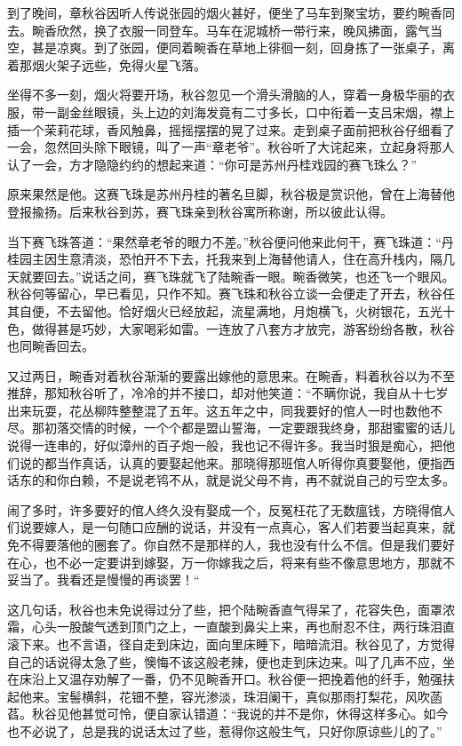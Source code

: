 \documentclass[12pt,UTF8]{ctexbook}
\begin{document}
{{{到了晚间，章秋谷因听人传说张园的烟火甚好，便坐了马车到聚宝坊，要约畹香同去。畹香欣然，换了衣服一同登车。马车在泥城桥一带行来，晚风拂面，露气当空，甚是凉爽。到了张园，便同着畹香在草地上徘徊一刻，回身拣了一张桌子，离着那烟火架子远些，免得火星飞落。

坐得不多一刻，烟火将要开场，秋谷忽见一个滑头滑脑的人，穿着一身极华丽的衣服，带一副金丝眼镜，头上边的刘海发竟有二寸多长，口中衔着一支吕宋烟，襟上插一个茉莉花球，香风触鼻，摇摇摆摆的晃了过来。走到桌子面前把秋谷仔细看了一会，忽然回头除下眼镜，叫了一声“章老爷”。秋谷听了大诧起来，立起身将那人认了一会，方才隐隐约约的想起来道：“你可是苏州丹桂戏园的赛飞珠么？”

原来果然是他。这赛飞珠是苏州丹桂的著名旦脚，秋谷极是赏识他，曾在上海替他登报揄扬。后来秋谷到苏，赛飞珠亲到秋谷寓所称谢，所以彼此认得。

当下赛飞珠答道：“果然章老爷的眼力不差。”秋谷便问他来此何干，赛飞珠道：“丹桂园主因生意清淡，恐怕开不下去，托我来到上海替他请人，住在高升栈内，隔几天就要回去。”说话之间，赛飞珠就飞了陆畹香一眼。畹香微笑，也还飞一个眼风。秋谷何等留心，早已看见，只作不知。赛飞珠和秋谷立谈一会便走了开去，秋谷任其自便，不去留他。恰好烟火已经放起，流星满地，月炮横飞，火树银花，五光十色，做得甚是巧妙，大家喝彩如雷。一连放了八套方才放完，游客纷纷各散，秋谷也同畹香回去。

又过两日，畹香对着秋谷渐渐的要露出嫁他的意思来。在畹香，料着秋谷以为不至推辞，那知秋谷听了，冷冷的并不接口，却对他笑道：“不瞒你说，我自从十七岁出来玩耍，花丛柳阵整整混了五年。这五年之中，同我要好的倌人一时也数他不尽。那初落交情的时候，一个个都是盟山誓海，一定要跟我终身，那甜蜜蜜的话儿说得一连串的，好似漳州的百子炮一般，我也记不得许多。我当时狠是痴心，把他们说的都当作真话，认真的要娶起他来。那晓得那班倌人听得你真要娶他，便指西话东的和你白赖，不是说老鸨不从，就是说父母不肯，再不就说自己的亏空太多。

闹了多时，许多要好的倌人终久没有娶成一个，反冤枉花了无数瘟钱，方晓得倌人们说要嫁人，是一句随口应酬的说话，并没有一点真心，客人们若要当起真来，就免不得要落他的圈套了。你自然不是那样的人，我也没有什么不信。但是我们要好在心，也不必一定要讲到嫁娶，万一你嫁我之后，将来有些不像意思地方，那就不妥当了。我看还是慢慢的再谈罢！“

这几句话，秋谷也未免说得过分了些，把个陆畹香直气得呆了，花容失色，面罩浓霜，心头一股酸气透到顶门之上，一直酸到鼻尖上来，再也耐忍不住，两行珠泪直滚下来。也不言语，径自走到床边，面向里床睡下，暗暗流泪。秋谷见了，方觉得自己的话说得太急了些，懊悔不该这般老辣，便也走到床边来。叫了几声不应，坐在床沿上又温存劝解了一番，仍不见畹香开口。秋谷便一把挽着他的纤手，勉强扶起他来。宝髻横斜，花钿不整，容光渗淡，珠泪阑干，真似那雨打梨花，风吹菡萏。秋谷见他甚觉可怜，便自家认错道：“我说的并不是你，休得这样多心。如今也不必说了，总是我的说话太过了些，惹得你这般生气，只好你原谅些儿的了。”

}}}
\end{document}
